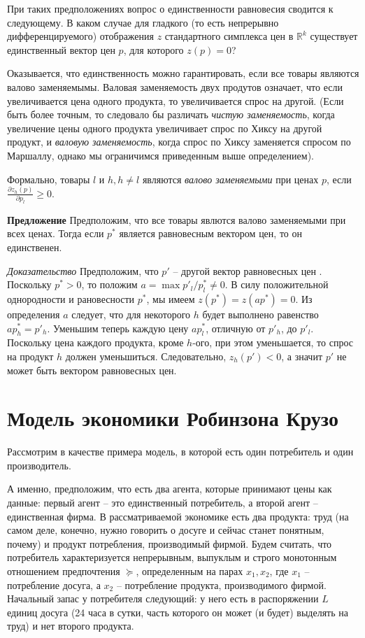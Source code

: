 При таких предположениях вопрос о единственности равновесия сводится
к следующему. В каком случае для гладкого (то есть непрерывно
дифференцируемого) отображения $z$ стандартного симплекса цен в
$\mathbb{R}^k$ существует единственный вектор цен $p$, для которого
$z(p)=0$?

Оказывается, что единственность можно гарантировать, если все товары
являются валово заменяемымы. Валовая заменяемость двух продутов
означает, что если увеличивается цена одного продукта, то
увеличивается спрос на другой. (Если быть более точным, то следовало
бы различать \emph{чистую заменяемость}, когда увеличение цены
одного продукта увеличивает спрос по Хиксу на другой продукт, и
\emph{валовую заменяемость}, когда спрос по Хиксу заменяется спросом
по Маршаллу, однако мы ограничимся приведенным выше определением).

Формально, товары $l$ и $h, h \neq l$ являются \emph{валово
заменяемыми} при ценах $p$, если
$\frac{\partial z_h(p)}{\partial p_l}\geq0.$

\textbf{Предложение} Предположим, что все товары явлются валово
заменяемыми при всех ценах. Тогда если $p^*$ является равновесным
вектором цен, то он единственен.

\emph{Доказательство} Предположим, что $p\prime$ -- другой вектор
равновесных цен . Поскольку $p^*>0$, то положим
$a=\max{p\prime_l/p^*_l\neq0}$. В силу положительной однородности и
рановесности $p^*$, мы имеем $z(p^*)=z(ap^*)=0$. Из определения $a$
следует, что для некоторого $h$ будет выполнено равенство
$ap^*_h=p\prime_h$. Уменьшим теперь каждую цену $ap^*_l$, отличную
от $p\prime_h$, до $p\prime_l$. Поскольку цена каждого продукта,
кроме $h$-ого, при этом уменьшается, то спрос на продукт $h$ должен
уменьшиться. Следовательно, $z_h(p\prime)<0$, а значит $p\prime$ не
может быть вектором равновесных цен.


\section*{Модель экономики Робинзона Крузо}

Рассмотрим в качестве примера модель, в которой есть один потребитель и один
производитель.

А именно, предположим, что есть два агента, которые принимают цены как данные:
первый агент -- это единственный потребитель, а второй агент --
единственная фирма.  В рассматриваемой экономике есть два продукта: труд
(на самом деле, конечно, нужно говорить о досуге и сейчас станет
понятным, почему) и продукт потребления, производимый фирмой.
Будем считать, что потребитель характеризуется непрерывным,
выпуклым и строго монотонным отношением предпочтения $\succeq$,
определенным на парах $x_1,x_2$, где $x_1$ -- потребление досуга,
а $x_2$ -- потребление продукта, производимого фирмой. Начальный запас
у потребителя следующий: у него есть в распоряжении
$L$ единиц досуга (24 часа в сутки, часть которого он может (и будет) выделять
на труд) и нет второго продукта.

